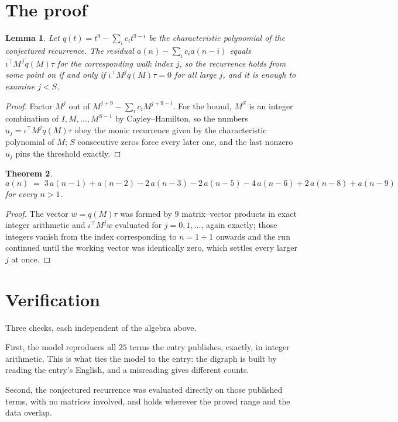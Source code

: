 \documentclass[11pt,a4paper]{article}
\theoremstyle{plain}
\newtheorem{theorem}{Theorem}
\newtheorem{lemma}[theorem]{Lemma}
\theoremstyle{definition}
\begin{document}
\section{The proof}

\begin{lemma}\label{lem:crit}
Let $q(t)=t^{9}-\sum_i c_it^{9-i}$ be the characteristic polynomial of the
conjectured recurrence. The residual $a(n)-\sum_ic_ia(n-i)$ equals
$\iota^{\!\top}M^{\,j}q(M)\tau$ for the corresponding walk index $j$, so the recurrence
holds from some point on if and only if $\iota^{\!\top}M^{j}q(M)\tau=0$ for all large $j$,
and it is enough to examine $j<S$.
\end{lemma}

\begin{proof}
Factor $M^{j}$ out of $M^{j+9}-\sum_ic_iM^{j+9-i}$. For the bound, $M^{S}$
is an integer combination of $I,M,\dots,M^{S-1}$ by Cayley--Hamilton, so the numbers
$u_j=\iota^{\!\top}M^{j}q(M)\tau$ obey the monic recurrence given by the characteristic
polynomial of $M$; $S$ consecutive zeros force every later one, and the last nonzero $u_j$
pins the threshold exactly.
\end{proof}

\begin{theorem}
\[
a(n)\;=\;3\,a(n-1) + a(n-2) - 2\,a(n-3) - 2\,a(n-5) - 4\,a(n-6) + 2\,a(n-8) + a(n-9)
\]
for every $n>1$.
\end{theorem}

\begin{proof}
The vector $w=q(M)\tau$ was formed by $9$ matrix--vector products in exact integer
arithmetic and $\iota^{\!\top}M^{j}w$ evaluated for $j=0,1,\dots$, again exactly; those
integers vanish from the index corresponding to $n=1+1$ onwards and the run continued
until the working vector was identically zero, which settles every larger $j$ at once.
\end{proof}

\section{Verification}

Three checks, each independent of the algebra above.

First, the model reproduces all $25$ terms the entry publishes, exactly, in integer
arithmetic. This is what ties the model to the entry: the digraph is built by reading the
entry's English, and a misreading gives different counts.

Second, the conjectured recurrence was evaluated directly on those published terms, with no
matrices involved, and holds wherever the proved range and the data overlap.
\end{document}
